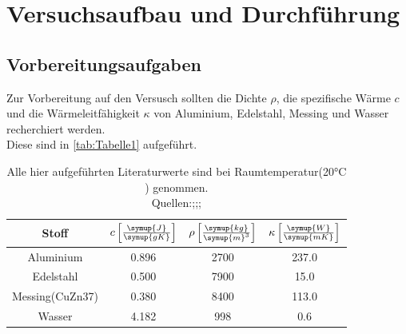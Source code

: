 \section{Versuchsaufbau und Durchführung}
\label{sec:Durchführung}
\subsection{Vorbereitungsaufgaben}
\label{subsec:Aufgaben}
Zur Vorbereitung auf den Versusch sollten die Dichte $\rho$, die spezifische Wärme $c$ und
die Wärmeleitfähigkeit $\kappa$ von Aluminium, Edelstahl, Messing und Wasser recherchiert werden.\\
Diese sind in \autoref{tab:Tabelle1} aufgeführt.
\begin{table}[H]
    \centering
    \caption{Alle hier aufgeführten Literaturwerte sind bei Raumtemperatur(20$\unit{\celsius}$) genommen. \\Quellen:\cite{stahl};\cite{demt};\cite{Geschke}; }
    \label{tab:Tabelle1}
    \begin{tabular}{cccc}
        \toprule
        Stoff&
        {$c \left[\frac{\symup{J}}{\symup{gK}}\right]$} &
        {$\rho \left[\frac{\symup{kg}}{\symup{m}^3}\right]$} &
        {$\kappa \left[\frac{\symup{W}}{\symup{mK}}\right]$} \\
        \midrule
        Aluminium & 0.896 & 2700 & 237.0 \\
        Edelstahl & 0.500 & 7900 & 15.0 \\
        Messing(CuZn37) & 0.380 & 8400 & 113.0 \\
        Wasser & 4.182 & 998 & 0.6 \\
        \bottomrule
    \end{tabular}
\end{table}
